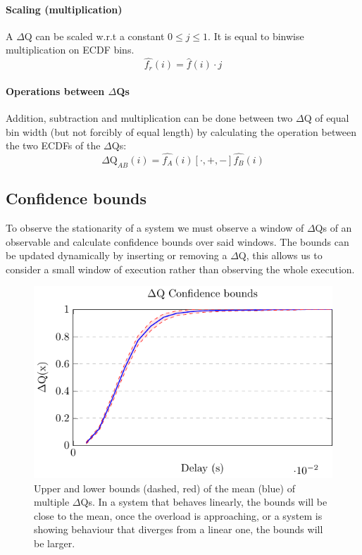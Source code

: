     \paragraph{Scaling (multiplication)} A $\Delta$Q can be scaled w.r.t a constant $0 \le j \le 1$. It is equal to binwise multiplication on ECDF bins.
    \begin{equation}
        \hat{f_r}(i) = \hat{f}(i) \cdot j
        \label{eq:mul_ecdf}
    \end{equation}

    \paragraph{Operations between $\Delta$Qs} 
        Addition, subtraction and multiplication can be done between two $\Delta$Q of equal bin width (but not forcibly of equal length) by calculating the operation between the two ECDFs of the $\Delta$Qs:
        \begin{equation}
            \Delta \text{Q}_{AB}(i) = \hat{f_A}(i) [\cdot, +, -] \hat{f_B}(i)
            \label{eq:op_dq}
        \end{equation}
    \subsection{Confidence bounds}
    To observe the stationarity of a system we must observe a window of $\Delta$Qs of an observable and calculate confidence bounds over said windows. The bounds can be updated dynamically by inserting or removing a $\Delta$Q, this allows us to consider a small window of execution rather than observing the whole execution.
        \begin{figure}[H]
            \begin{center}
                \includegraphics[scale=1.2]{tikz/ci.pdf} 
            \end{center}
            \caption{Upper and lower bounds (dashed, red) of the mean (blue) of multiple $\Delta$Qs. In a system that behaves linearly, the bounds will be close to the mean, once the overload is approaching, or a system is showing behaviour that diverges from a linear one, the bounds will be larger.}
        \end{figure}

  
